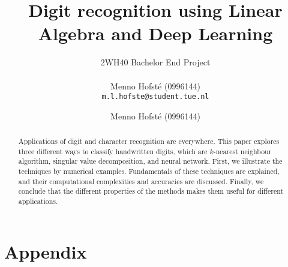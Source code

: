 \documentclass[a4paper, 11pt]{article}
\title{Digit recognition using Linear Algebra and Deep Learning}
\subtitle{2WH40 Bachelor End Project \\~\\ \small{Menno Hofst\'e\tabto*{7em} (0996144)\\ \texttt{m.l.hofste@student.tue.nl}}}
\author{Menno Hofst\'e\tabto*{7em} (0996144)}
\newcommand{\0}{\phantom{0}}
\begin{document}
\maketitle
\begin{abstract}\noindent
  Applications of digit and character recognition are everywhere.
  This paper explores three different ways to classify handwritten digits, which are \(k\)-nearest neighbour algorithm, singular value decomposition, and neural network. First, we illustrate the techniques by numerical examples. Fundamentals of these techniques are explained, and their computational complexities and accuracies are discussed.
  Finally, we conclude that the different properties of the methods makes them useful for different applications.
\end{abstract}
\newpage
\thispagestyle{empty}
\setcounter{page}{0}
\tableofcontents






% 
% 
\printbibliography\newpage
\section{Appendix}
\inputminted[fontsize=\small]{matlab}{../matlab/digit_classifier.m}
\end{document}
